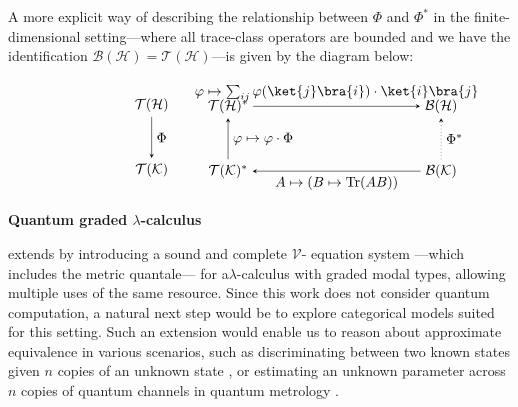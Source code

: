 A more explicit way of describing the relationship between $\Phi$ and $\Phi^*$ in the finite-dimensional setting---where all trace-class operators are bounded and we have the identification \( \mathcal{B}(\mathcal{H}) = \mathcal{T}(\mathcal{H}) \)---is given by the diagram below:

\[
\hspace{-50pt}
\begin{minipage}{0.45\textwidth}
\centering
\begin{tikzpicture}
  \matrix (m) [matrix of math nodes,row sep=3em,column sep=2em,minimum width=1em]
  { 
    \mathcal{T}(\mathcal{H}) \\
     \mathcal{T}(\mathcal{K})  \\
  };
  \path[-stealth]
    (m-1-1) edge  node [right] {$\Phi$} (m-2-1);
\end{tikzpicture}
\end{minipage}
\hspace{-50pt}
\begin{minipage}{0.45\textwidth}
\centering
\begin{tikzpicture}
  \matrix (m) [matrix of math nodes,row sep=3em,column sep=12em,minimum width=1em]
  {
  \mathcal{T}(\mathcal{H})^*&  \mathcal{B}(\mathcal{H})  \\
   \mathcal{T}(\mathcal{K})^* &  \mathcal{B}(\mathcal{K}) \\
  };
  \path[-stealth]
    (m-1-1) edge  node [above] {$\varphi \mapsto \sum_{ij} \varphi(\ket{j}\bra{i}) \cdot \ket{i} \bra{j}  $} (m-1-2)
    (m-2-2) edge [dotted]  node [right] {$\Phi^*$} (m-1-2)
    (m-2-2) edge  node [below] {$ A \mapsto (B \mapsto \tr(AB)) $} (m-2-1)
    (m-2-1) edge  node [right] {$ \varphi \mapsto \varphi \cdot \Phi $} (m-1-1)
    ;
\end{tikzpicture}
\end{minipage}
\]




\textbf{Quantum graded $\lambda$-calculus}

  \cite{dahlqvistCompleteVEquationalSystem2023} extends  \cite{dahlqvist2023syntactic} by introducing a sound and complete $\mathcal{V}$- equation system ---which includes the metric quantale--- for a$\lambda$-calculus with graded modal types, allowing multiple uses of the same resource. Since this work does not consider quantum computation, a natural next step would be to explore categorical models suited for this setting. Such an extension would enable us to reason about approximate equivalence in various scenarios, such as discriminating between two known states given $n$ copies of an unknown state \cite{Multiple_copy_two_state_discrimination}, or estimating an unknown parameter across $n$ copies of quantum channels in quantum metrology \cite{Giovannetti_Quantum_Metrology, Zhou_Limits_Noisy_Quantum_Metrology}.

